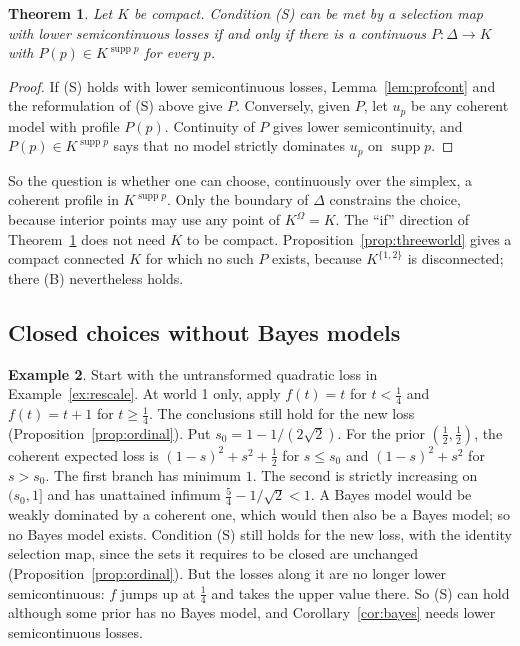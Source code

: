 \documentclass[11pt]{article}
\newtheorem{theorem}{Theorem}[section]
\theoremstyle{definition}
\newtheorem{example}[theorem]{Example}
\theoremstyle{remark}
\newcommand{\supp}{\operatorname{supp}}
\begin{document}
\begin{theorem}\label{thm:selection}
Let $K$ be compact. Condition (S) can be met by a selection map with lower semicontinuous losses if and only if there is a continuous $P:\Delta\to K$ with $P(p)\in K^{\supp p}$ for every $p$.
\end{theorem}
\begin{proof}
If (S) holds with lower semicontinuous losses, Lemma~\ref{lem:profcont} and the reformulation of (S) above give $P$. Conversely, given $P$, let $u_p$ be any coherent model with profile $P(p)$. Continuity of $P$ gives lower semicontinuity, and $P(p)\in K^{\supp p}$ says that no model strictly dominates $u_p$ on $\supp p$.
\end{proof}
So the question is whether one can choose, continuously over the simplex, a coherent profile in $K^{\supp p}$. Only the boundary of $\Delta$ constrains the choice, because interior points may use any point of $K^\Omega=K$. The ``if'' direction of Theorem~\ref{thm:selection} does not need $K$ to be compact. Proposition~\ref{prop:threeworld} gives a compact connected $K$ for which no such $P$ exists, because $K^{\{1,2\}}$ is disconnected; there (B) nevertheless holds.

\subsection{Closed choices without Bayes models}
\begin{example}\label{ex:discontinuous}
Start with the untransformed quadratic loss in Example~\ref{ex:rescale}. At world 1 only, apply $f(t)=t$ for $t<\tfrac14$ and $f(t)=t+1$ for $t\ge\tfrac14$. The conclusions still hold for the new loss (Proposition~\ref{prop:ordinal}). Put $s_0=1-1/(2\sqrt2)$. For the prior $(\tfrac12,\tfrac12)$, the coherent expected loss is $(1-s)^2+s^2+\tfrac12$ for $s\le s_0$ and $(1-s)^2+s^2$ for $s>s_0$. The first branch has minimum $1$. The second is strictly increasing on $(s_0,1]$ and has unattained infimum $\tfrac54-1/\sqrt2<1$. A Bayes model would be weakly dominated by a coherent one, which would then also be a Bayes model; so no Bayes model exists. Condition (S) still holds for the new loss, with the identity selection map, since the sets it requires to be closed are unchanged (Proposition~\ref{prop:ordinal}). But the losses along it are no longer lower semicontinuous: $f$ jumps up at $\tfrac14$ and takes the upper value there. So (S) can hold although some prior has no Bayes model, and Corollary~\ref{cor:bayes} needs lower semicontinuous losses.
\end{example}
\end{document}
